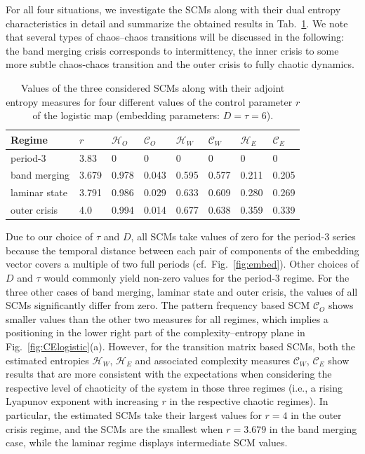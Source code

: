 \documentclass[12pt,aip,cha,reprint,nofootinbib]{revtex4-1}
\begin{document}
For all four situations, we investigate the SCMs along with their dual entropy characteristics in detail and summarize the obtained results in Tab.~\ref{tableLog}. We note that several types of chaos--chaos transitions will be discussed in the following: the band merging crisis corresponds to intermittency, the inner crisis to some more subtle chaos-chaos transition and the outer crisis to fully chaotic dynamics. 

\begin{table}[htb]
    {\begin{tabular}{l  l  l  l  l  l  l  l}
    \hline
    Regime & $r$      & $\mathcal{H}_O$ & $\mathcal{C}_O$ & $\mathcal{H}_W$ & $\mathcal{C}_W$ & $\mathcal{H}_E$   & $\mathcal{C}_E$  \\
    \hline
    period-3      & 3.83 & 0 & 0 & 0 & 0 & 0 & 0 \\
    \hline
    band merging    & 3.679 & 0.978 & 0.043 & 0.595 & 0.577 & 0.211 & 0.205  \\
    \hline
    laminar state    & 3.791 & 0.986 & 0.029 & 0.633 & 0.609 & 0.280 & 0.269 \\
    \hline
    outer crisis  & 4.0 & 0.994 & 0.014 & 0.677 & 0.638 & 0.359 & 0.339 \\
    \hline
    \end{tabular}}
   \caption{Values of the three considered SCMs along with their adjoint entropy measures for four different values of the control parameter $r$ of the logistic map (embedding parameters: $D = \tau = 6$).   \label{tableLog}}    
\end{table}

Due to our choice of $\tau$ and $D$, all SCMs take values of zero for the period-3 series because the temporal distance between each pair of components of the embedding vector covers a multiple of two full periods (cf.~Fig.~\ref{fig:embed}). Other choices of $D$ and $\tau$ would commonly yield non-zero values for the period-3 regime. For the three other cases of band merging, laminar state and outer crisis, the values of all SCMs significantly differ from zero. The pattern frequency based SCM $\mathcal{C}_O$ shows smaller values than the other two measures for all regimes, which implies a positioning in the lower right part of the complexity--entropy plane in Fig.~\ref{fig:CElogistic}(a). However, for the transition matrix based SCMs, both the estimated entropies $\mathcal{H}_W$, $\mathcal{H}_E$ and associated complexity measures $\mathcal{C}_W$, $\mathcal{C}_E$ show results that are more consistent with the expectations when considering the respective level of chaoticity of the system in those three regimes (i.e., a rising Lyapunov exponent with increasing $r$ in the respective chaotic regimes). In particular, the estimated SCMs take their largest values for $r = 4$ in the outer crisis regime, and the SCMs are the smallest when $r = 3.679$ in the band merging case, while the laminar regime displays intermediate SCM values. 
\end{document}
